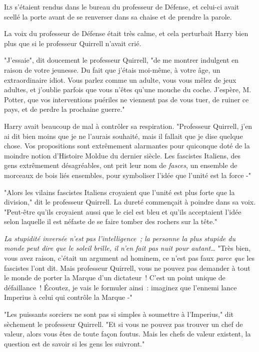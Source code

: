 
\lettrine{I}{ls} s'étaient rendus dans le bureau du professeur de Défense, et celui-ci avait scellé la porte avant de se renverser dans sa chaise et de prendre la parole.

La voix du professeur de Défense était très calme, et cela perturbait Harry bien plus que si le professeur Quirrell n'avait crié.

"J'essaie", dit doucement le professeur Quirrell, "de me montrer indulgent en raison de votre jeunesse. Du fait que j'étais moi-même, à votre âge, un extraordinaire idiot. Vous parlez comme un adulte, vous vous mêlez de jeux adultes, et j'oublie parfois que vous n'êtes qu'une mouche du coche. J'espère, M. Potter, que vos interventions puériles ne viennent pas de vous tuer, de ruiner ce pays, et de perdre la prochaine guerre."

Harry avait beaucoup de mal à contrôler sa respiration. "Professeur Quirrell, j'en ai dit bien moins que je ne l'aurais souhaité, mais il fallait que je dise quelque chose. Vos propositions sont extrêmement alarmantes pour quiconque doté de la moindre notion d'Histoire Moldue du dernier siècle. Les fascistes Italiens, des gens extrêmement désagréables, ont prit leur nom de \emph{fasces}, un ensemble de morceaux de bois liés ensembles, pour symboliser l'idée que l'unité est la force -"

"Alors les vilains fascistes Italiens croyaient que l'unité est plus forte que la division," dit le professeur Quirrell. La dureté commençait à poindre dans sa voix. "Peut-être qu'ils croyaient aussi que le ciel est bleu et qu'ils acceptaient l'idée selon laquelle il est néfaste de se faire tomber des rochers sur la tête."

\emph{La stupidité inversée n'est pas l'intelligence~; la personne la plus stupide du monde peut dire que le soleil brille, il n'en fait pas nuit pour autant…} "Très bien, vous avez raison, c'était un argument ad hominem, ce n'est pas faux \emph{parce que} les fascistes l'ont dit. Mais professeur Quirrell, vous ne pouvez pas demander à tout le monde de porter la Marque d'un dictateur~! C'est un point unique de défaillance~! Écoutez, je vais le formuler ainsi~: imaginez que l'ennemi lance Imperius à celui qui contrôle la Marque -"

"Les puissants sorciers ne sont pas si simples à soumettre à l'Imperius," dit sèchement le professeur Quirrell. "Et si vous ne pouvez pas trouver un chef de valeur, alors vous êtes de toute façon foutus. Mais les chefs de valeur existent, la question est de savoir si les gens les suivront."

